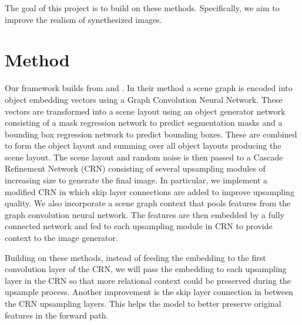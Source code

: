 \documentclass{article}
\begin{document}
The goal of this project is to build on these methods. Specifically, we aim to improve the realism of synethesized images.

\section{Method}

Our framework builds from \cite{sg2im} and \cite{sg2imgcontext}. In their method a scene graph is encoded into object embedding vectors using a Graph Convolution Neural Network. These vectors are transformed into a scene layout using an object generator network consisting of a mask regression network to predict segmentation masks and a bounding box regression network to predict bounding boxes. These are combined to form the object layout and summing over all object layouts producing the scene layout. The scene layout and random noise is then passed to a Cascade Refinement Network (CRN) \cite{crn} consisting of several upsampling modules of increasing size to generate the final image. In particular, we implement a modified CRN in which skip layer connections are added to improve upsampling quality. We also incorporate a scene graph context \cite{sg2imgcontext} that pools features from the graph convolution neural network. The features are then embedded by a fully connected network and fed to each upsampling module in CRN to provide context to the image generator.

Building on these methods, instead of feeding the embedding to the first convolution layer of the CRN, we will pass the embedding to each upsampling layer in the CRN so that more relational context could be preserved during the upsample process. Another improvement is the skip layer connection in between the CRN upsampling layers. This helps the model to better preserve original features in the forward path.



\end{document}
